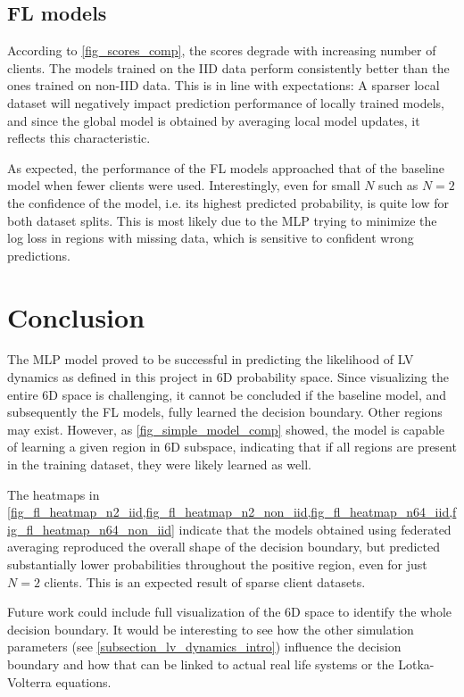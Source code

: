 \documentclass[a4paper]{scrartcl}
\begin{document}
\subsection{FL models}
According to \cref{fig_scores_comp}, the scores degrade with increasing number of clients. The models trained on the IID data perform consistently better than the ones trained on non-IID data. This is in line with expectations: A sparser local dataset will negatively impact prediction performance of locally trained models, and since the global model is obtained by averaging local model updates, it reflects this characteristic.

As expected, the performance of the FL models approached that of the baseline model when fewer clients were used.  Interestingly, even for small $N$ such as $N=2$ the confidence of the model, i.e. its highest predicted probability, is quite low for both dataset splits. This is most likely due to the MLP trying to minimize the log loss in regions with missing data, which is sensitive to confident wrong predictions.

\section{Conclusion}
The MLP model proved to be successful in predicting the likelihood of LV dynamics as defined in this project in 6D probability space. Since visualizing the entire 6D space is challenging, it cannot be concluded if the baseline model, and subsequently the FL models, fully learned the decision boundary. Other regions may exist. However, as \cref{fig_simple_model_comp} showed, the model is capable of learning a given region in 6D subspace, indicating that if all regions are present in the training dataset, they were likely learned as well.

The heatmaps in \cref{fig_fl_heatmap_n2_iid,fig_fl_heatmap_n2_non_iid,fig_fl_heatmap_n64_iid,fig_fl_heatmap_n64_non_iid} indicate that the models obtained using federated averaging reproduced the overall shape of the decision boundary, but predicted substantially lower probabilities throughout the positive region, even for just $N=2$ clients. This is an expected result of sparse client datasets.

Future work could include full visualization of the 6D space to identify the whole decision boundary. It would be interesting to see how the other simulation parameters (see \cref{subsection_lv_dynamics_intro}) influence the decision boundary and how that can be linked to actual real life systems or the Lotka-Volterra equations.
\end{document}
